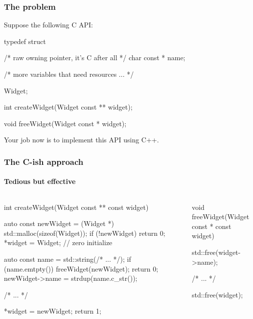\documentclass{beamer}
\begin{document}

\begin{frame}[fragile]
\frametitle{The problem}
Suppose the following C API:

\begin{C++}
typedef struct
{
    /* raw owning pointer, it's C after all */
    char const * name;

    /* more variables that need resources ... */
} Widget;

int createWidget(Widget const ** widget);

void freeWidget(Widget const * widget);
\end{C++}

Your job now is to implement this API using C++.
\end{frame}


\begin{frame}[fragile]
\frametitle{The C-ish approach}
\framesubtitle{Tedious but effective}
\begin{columns}
\begin{column}{0.45\textwidth}
\begin{TinyC++}
int createWidget(Widget const ** const widget)
{
	auto const newWidget = (Widget *) std::malloc(sizeof(Widget));
	if (!newWidget)
	{
		return 0;
	}
	*widget = Widget{}; // zero initialize
    
	auto const name = std::string(/* ... */);
	if (name.emtpty())
	{
		freeWidget(newWidget);
		return 0;
	}
	newWidget->name = strdup(name.c_str());
    
	/* ... */
    
	*widget = newWidget;
	return 1;
}
\end{TinyC++}
\end{column}
\begin{column}{0.45\textwidth}
\begin{TinyC++}
void freeWidget(Widget const * const widget)
{
	std::free(widget->name);
    
	/* ... */
    
	std::free(widget);
}
\end{TinyC++}
\end{column}
\end{columns}
\end{frame}

\end{document}
